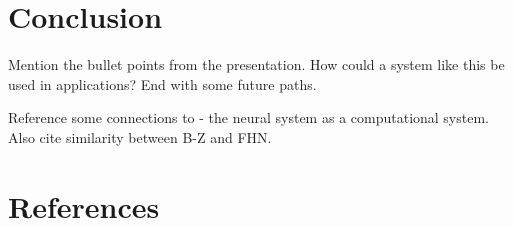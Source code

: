 \documentclass[
    11pt,
]{article}
\begin{document}
\section{Conclusion}

Mention the bullet points from the presentation.  How could a system like this be used in applications?  End with some future paths.


Reference some connections to \citet{adamatzky2008} - the neural system as a computational system.  Also cite similarity between B-Z and FHN.

\section{References}

% 
\printbibliography[heading=none]
\end{document}
